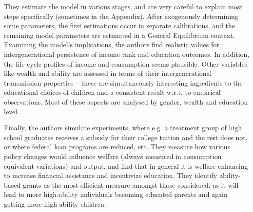 \documentclass[12pt,a4paper,xcolor=dvipsnames]{article}
\begin{document}
They estimate the model in various stages, and are very careful to explain most steps specifically (sometimes in the Appendix). After exogenously determining some parameters, the first estimations occur in separate calibrations, and the remaining model parameters are estimated in a General Equilibrium context. 
 Examining the model’s implications, the authors find realistic values for intergenerational persistence of income rank and education outcomes. In addition, the life cycle profiles of income and consumption seems plausible. Other variables like wealth and ability are assessed in terms of their intergenerational transmission properties – these are simultaneously interesting ingredients to the educational choices of children and a consistent result w.r.t. to empirical observations. Most of these aspects are analysed by gender, wealth and education level. 
 
Finally, the authors simulate experiments, where e.g. a treatment group of high school graduates receives a subsidy for their college tuition and the rest does not, or where federal loan programs are reduced, etc. They measure how various policy changes would influence welfare (always measured in consumption equivalent variations) and output, and find that in general it is welfare enhancing to increase financial assistance and incentivize education. They identify ability-based grants as the most efficient measure amongst those considered, as it will lead to more high-ability individuals becoming educated parents and again getting more high-ability children. 


\pagebreak
\end{document}
